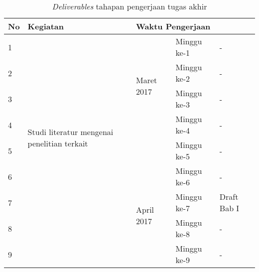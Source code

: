\begin {table}[H]
\begin{center}
\begin{tabular}{|p{.5cm}|l|l|l|l|}

\hline
No & Kegiatan & \multicolumn{2}{|l|}{Waktu Pengerjaan} & \\
\hline

1 & \multirow{8}{2.5cm}{Studi literatur mengenai penelitian terkait} & \multirow{4}{*}{Maret 2017} & Minggu ke-1 & - \\
\cline{1-1} \cline{4-5}

2 & & & Minggu ke-2 & - \\
\cline{1-1} \cline{4-5}

3 & & & Minggu ke-3 & - \\
\cline{1-1} \cline{4-5}

4 & & & Minggu ke-4 & - \\
\cline{1-1} \cline{4-5}

5 & & & Minggu ke-5 & - \\
\cline{1-1} \cline{3-5}

6 & & \multirow{4}{*}{April 2017} & Minggu ke-6 & - \\
\cline{1-1} \cline{4-5}

7 & & & Minggu ke-7 & Draft Bab I \\
\cline{1-1} \cline{4-5}

8 & & & Minggu ke-8 & - \\
\cline{1-1} \cline{4-5}

9 & & & Minggu ke-9 & - \\
\hline


\end{tabular}
\caption {\emph{Deliverables} tahapan pengerjaan tugas akhir}
\end{center}
\end{table}
